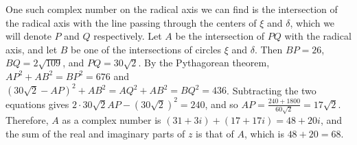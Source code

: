 \documentclass{article}
\begin{document}
\begin{enumerate}
One such complex number on the radical axis we can find is the intersection of the radical axis with the line passing through the centers of $\xi$ and $\delta$, which we will denote $P$ and $Q$ respectively. Let $A$ be the intersection of $PQ$ with the radical axis, and let $B$ be one of the intersections of circles $\xi$ and $\delta$. Then $BP=26$, $BQ=2\sqrt{109}$, and $PQ=30\sqrt{2}$. By the Pythagorean theorem, $AP^2+AB^2=BP^2=676$ and $(30\sqrt{2}-AP)^2+AB^2=AQ^2+AB^2=BQ^2=436$. Subtracting the two equations gives $2 \cdot 30\sqrt{2} AP - (30\sqrt{2})^2 = 240$, and so $AP = \frac{240+1800}{60\sqrt{2}} = 17\sqrt{2}$. Therefore, $A$ as a complex number is $(31+3i)+(17+17i)=48+20i$, and the sum of the real and imaginary parts of $z$ is that of $A$, which is $48+20=\boxed{68}$.

\end{enumerate}

\iffalse

\fi
\end{document}

